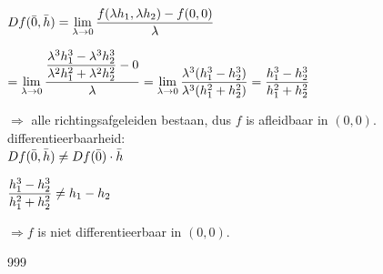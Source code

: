 \documentclass[a4paper]{article}
\begin{document}
$Df(\bar 0,\bar h) = \lim\limits_{\lambda \to 0} \dfrac{f(\lambda h_1, \lambda h_2) - f(0,0)}{\lambda} \\$

$= \lim\limits_{\lambda \to 0} \dfrac{\dfrac{\lambda^3 h_1^3 - \lambda^3 h_2^3}{\lambda^2 h_1^2 + \lambda^2 h_2^2} - 0}{\lambda} = \lim\limits_{\lambda \to 0} \dfrac{\lambda^3 (h_1^3 - h_2^3)}{\lambda^3 (h_1^2 + h_2^2)} = \dfrac{h_1^3 - h_2^3}{h_1^2 + h_2^2} \\$

$\Rightarrow$ alle richtingsafgeleiden bestaan, dus $f$ is afleidbaar in $(0,0)$. \\

differentieerbaarheid: \\

$Df(\bar 0,\bar h) \neq Df(\bar 0) \cdot \bar h \\$

$\dfrac{h_1^3 - h_2^3}{h_1^2 + h_2^2} \neq h_1 - h_2 \\$

$\Rightarrow f$ is niet differentieerbaar in $(0,0)$. \\

\begin{thebibliography}{999}
\end{thebibliography}
\end{document}
